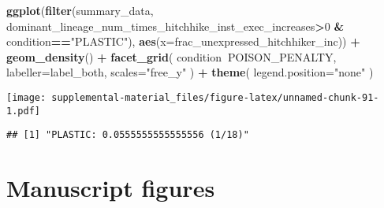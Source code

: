 \documentclass[]{book}
\newenvironment{Shaded}{\begin{snugshade}}{\end{snugshade}}
\newcommand{\DataTypeTok}[1]{\textcolor[rgb]{0.13,0.29,0.53}{#1}}
\newcommand{\DecValTok}[1]{\textcolor[rgb]{0.00,0.00,0.81}{#1}}
\newcommand{\FloatTok}[1]{\textcolor[rgb]{0.00,0.00,0.81}{#1}}
\newcommand{\KeywordTok}[1]{\textcolor[rgb]{0.13,0.29,0.53}{\textbf{#1}}}
\newcommand{\NormalTok}[1]{#1}
\newcommand{\OperatorTok}[1]{\textcolor[rgb]{0.81,0.36,0.00}{\textbf{#1}}}
\newcommand{\StringTok}[1]{\textcolor[rgb]{0.31,0.60,0.02}{#1}}
\begin{document}
\begin{Shaded}
\begin{Highlighting}[]
\KeywordTok{ggplot}\NormalTok{(}\KeywordTok{filter}\NormalTok{(summary_data, dominant_lineage_num_times_hitchhike_inst_exec_increases}\OperatorTok{>}\DecValTok{0} \OperatorTok{&}\StringTok{ }\NormalTok{condition}\OperatorTok{==}\StringTok{"PLASTIC"}\NormalTok{), }\KeywordTok{aes}\NormalTok{(}\DataTypeTok{x=}\NormalTok{frac_unexpressed_hitchhiker_inc)) }\OperatorTok{+}
\StringTok{  }\KeywordTok{geom_density}\NormalTok{() }\OperatorTok{+}
\StringTok{  }\KeywordTok{facet_grid}\NormalTok{(}
\NormalTok{    condition}\OperatorTok{~}\NormalTok{POISON_PENALTY,}
    \DataTypeTok{labeller=}\NormalTok{label_both,}
    \DataTypeTok{scales=}\StringTok{"free_y"}
\NormalTok{  ) }\OperatorTok{+}
\StringTok{  }\KeywordTok{theme}\NormalTok{(}
    \DataTypeTok{legend.position=}\StringTok{"none"}
\NormalTok{  )}
\end{Highlighting}
\end{Shaded}

\texttt{[image: supplemental-material\_files/figure-latex/unnamed-chunk-91-1.pdf]}

\begin{Shaded}
\end{Shaded}

\begin{verbatim}
## [1] "PLASTIC: 0.0555555555555556 (1/18)"
\end{verbatim}

\hypertarget{manuscript-figures-2}{%
\section{Manuscript figures}\label{manuscript-figures-2}}
\end{document}
